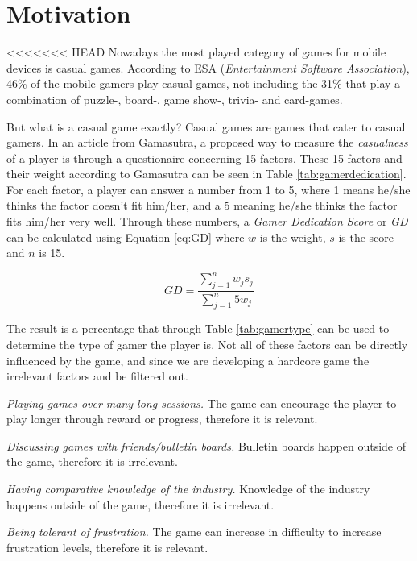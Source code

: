 \section{Motivation} \label{sec:motivation}
<<<<<<< HEAD
Nowadays the most played category of games for mobile devices is casual games.
According to ESA\cite{ESA}\cite{ESApdf} (\textit{Entertainment Software Association}), 46\% of the mobile gamers play casual games, not including the 31\% that play a combination of puzzle-, board-, game show-, trivia- and card-games.

But what is a casual game exactly?
Casual games are games that cater to casual gamers.
In an article from Gamasutra, a proposed way to measure the \textit{casualness} of a player is through a questionaire concerning 15 factors\cite{casual_vs_hardcore}.
These 15 factors and their weight according to Gamasutra can be seen in Table \ref{tab:gamerdedication}\cite{casual_vs_hardcore}.
For each factor, a player can answer a number from 1 to 5, where 1 means he/she thinks the factor doesn't fit him/her, and a 5 meaning he/she thinks the factor fits him/her very well.
Through these numbers, a \emph{Gamer Dedication Score} or \emph{GD} can be calculated using Equation \ref{eq:GD} where $w$ is the weight, $s$ is the score and $n$ is 15.

\begin{equation}\label{eq:GD}
GD = \frac{\sum\limits_{j=1}^n w_j s_j}{\sum\limits_{j=1}^n 5 w_j}
\end{equation}

The result is a percentage that through Table \ref{tab:gamertype} can be used to determine the type of gamer the player is\cite{casual_vs_hardcore}.
Not all of these factors can be directly influenced by the game, and since we are developing a hardcore game the irrelevant factors and be filtered out.

\emph{Playing games over many long sessions.}
The game can encourage the player to play longer through reward or progress, therefore it is relevant.

\emph{Discussing games with friends/bulletin boards.}
Bulletin boards happen outside of the game, therefore it is irrelevant. 

\emph{Having comparative knowledge of the industry.}
Knowledge of the industry happens outside of the game, therefore it is irrelevant.

\emph{Being tolerant of frustration.}
The game can increase in difficulty to increase frustration levels, therefore it is relevant.

